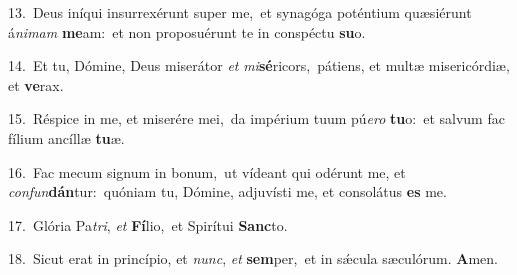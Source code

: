 {\numbfont\textcolor{\numbcolor}{13.}}~Deus iníqui insurrexérunt super me,~\dagger et synagóga poténtium quæsiérunt á\-\textit{ni}\-\textit{mam} \textbf{me}\-am:~\star et non proposuérunt te in conspéctu \textbf{su}\-o.\par
{\numbfont\textcolor{\numbcolor}{14.}}~Et tu, Dómine, Deus miserátor \textit{et} \textit{mi}\-\textbf{sé}ricors,~\star pátiens, et multæ misericórdiæ, et \textbf{ve}\-rax.\par
{\numbfont\textcolor{\numbcolor}{15.}}~Réspice in me, et miserére mei,~\dagger da impérium tuum pú\-\textit{e}\-\textit{ro} \textbf{tu}\-o:~\star et salvum fac fílium ancíllæ \textbf{tu}\-æ.\par
{\numbfont\textcolor{\numbcolor}{16.}}~Fac mecum signum in bonum,~\dagger ut vídeant qui odérunt me, et \textit{con}\-\textit{fun}\textbf{dán}tur:~\star quóniam tu, Dómine, adjuvísti me, et consolátus \textbf{es} me.\par
{\numbfont\textcolor{\numbcolor}{17.}}~Glória Pa\-\textit{tri}\-, \textit{et} \textbf{Fí}\-lio,~\star et Spirítui \textbf{Sanc}\-to.\par
{\numbfont\textcolor{\numbcolor}{18.}}~Sicut erat in princípio, et \textit{nunc}\-, \textit{et} \textbf{sem}\-per,~\star et in sǽcula sæculórum. \textbf{A}\-men.\par
